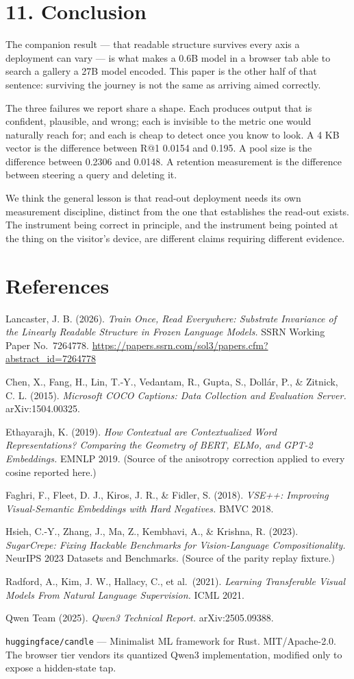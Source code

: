 \documentclass[
  11pt,
]{article}
\begin{document}
\section{11. Conclusion}\label{conclusion}

The companion result --- that readable structure survives every axis a
deployment can vary --- is what makes a 0.6B model in a browser tab able
to search a gallery a 27B model encoded. This paper is the other half of
that sentence: surviving the journey is not the same as arriving aimed
correctly.

The three failures we report share a shape. Each produces output that is
confident, plausible, and wrong; each is invisible to the metric one
would naturally reach for; and each is cheap to detect once you know to
look. A 4 KB vector is the difference between R@1 0.0154 and 0.195. A
pool size is the difference between 0.2306 and 0.0148. A retention
measurement is the difference between steering a query and deleting it.

We think the general lesson is that read-out deployment needs its own
measurement discipline, distinct from the one that establishes the
read-out exists. The instrument being correct in principle, and the
instrument being pointed at the thing on the visitor's device, are
different claims requiring different evidence.

\section{References}\label{references}

Lancaster, J. B. (2026). \emph{Train Once, Read Everywhere: Substrate
Invariance of the Linearly Readable Structure in Frozen Language
Models.} SSRN Working Paper No.~7264778.
\url{https://papers.ssrn.com/sol3/papers.cfm?abstract_id=7264778}

Chen, X., Fang, H., Lin, T.-Y., Vedantam, R., Gupta, S., Dollár, P., \&
Zitnick, C. L. (2015). \emph{Microsoft COCO Captions: Data Collection
and Evaluation Server.} arXiv:1504.00325.

Ethayarajh, K. (2019). \emph{How Contextual are Contextualized Word
Representations? Comparing the Geometry of BERT, ELMo, and GPT-2
Embeddings.} EMNLP 2019. (Source of the anisotropy correction applied to
every cosine reported here.)

Faghri, F., Fleet, D. J., Kiros, J. R., \& Fidler, S. (2018).
\emph{VSE++: Improving Visual-Semantic Embeddings with Hard Negatives.}
BMVC 2018.

Hsieh, C.-Y., Zhang, J., Ma, Z., Kembhavi, A., \& Krishna, R. (2023).
\emph{SugarCrepe: Fixing Hackable Benchmarks for Vision-Language
Compositionality.} NeurIPS 2023 Datasets and Benchmarks. (Source of the
parity replay fixture.)

Radford, A., Kim, J. W., Hallacy, C., et al.~(2021). \emph{Learning
Transferable Visual Models From Natural Language Supervision.} ICML
2021.

Qwen Team (2025). \emph{Qwen3 Technical Report.} arXiv:2505.09388.

\texttt{huggingface/candle} --- Minimalist ML framework for Rust.
MIT/Apache-2.0. The browser tier vendors its quantized Qwen3
implementation, modified only to expose a hidden-state tap.
\end{document}

